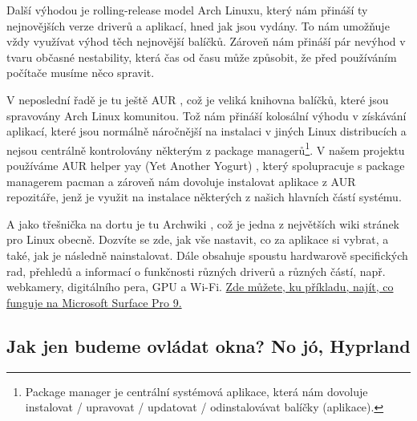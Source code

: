 \documentclass[12pt,a4paper]{article}
\begin{document}
Další výhodou je rolling-release model Arch Linuxu, který nám přináší ty nejnovějších verze driverů a aplikací,
hned jak jsou vydány.
To nám umožňuje vždy využívat výhod těch nejnovější balíčků. Zároveň nám přináší pár nevýhod v tvaru
občasné nestability, která čas od času může způsobit, že před používáním počítače musíme něco spravit.

V neposlední řadě je tu ještě AUR \autocite{AURHome}, což je veliká knihovna balíčků, které jsou spravovány Arch Linux
komunitou. Tož nám přináší kolosální výhodu v získávání aplikací, které jsou normálně náročnější na instalaci
v jiných Linux distribucích a nejsou centrálně kontrolovány některým z package managerů\footnote{Package manager je centrální systémová
aplikace, která nám dovoluje instalovat / upravovat / updatovat / odinstalovávat balíčky (aplikace).}.
V našem projektu používáme AUR helper yay (Yet Another Yogurt) \autocite{joJguerYay2026}, který spolupracuje s
package managerem pacman a zároveň nám dovoluje instalovat aplikace z AUR repozitáře, jenž je využit na instalace
některých z našich hlavních částí systému.

A jako třešnička na dortu je tu Archwiki \autocite{ArchWiki}, což je jedna z největších wiki stránek pro Linux obecně.
Dozvíte se zde, jak vše nastavit, co za aplikace si vybrat, a také, jak je následně nainstalovat. Dále
obsahuje spoustu hardwarově specifických rad, přehledů a informací o funkčnosti různých driverů a různých částí,
např. webkamery, digitálního pera, GPU a Wi-Fi. \href{https://wiki.Arch Linux.org/title/Microsoft_Surface_Pro_9}{Zde můžete,
ku příkladu, najít, co funguje na Microsoft Surface Pro 9.}


\subsection{Jak jen budeme ovládat okna? No jó, Hyprland}

\end{document}
